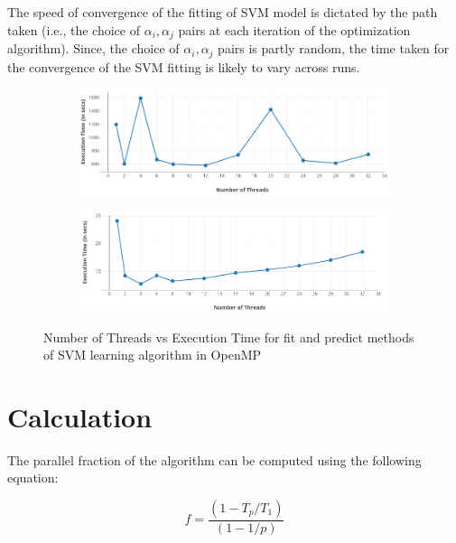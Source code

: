 \documentclass{article}
\begin{document}
	The speed of convergence of the fitting of SVM model is dictated by the path taken (i.e., the choice of $\alpha_i, \alpha_j$ pairs at each iteration of the optimization algorithm). Since, the choice of $\alpha_i, \alpha_j$ pairs is partly random, the time taken for the convergence of the SVM fitting is likely to vary across runs.
	
	\begin{figure}[!htbp]

		\centering
		\begin{subfigure}[!htbp]{\textwidth}
			\centering
			\includegraphics[scale=0.5]{fit_graph}
		\end{subfigure}
		
		\begin{subfigure}[!htbp]{\textwidth}
			\centering
			\includegraphics[scale=0.5]{predict_graph}
		\end{subfigure}
	
		\caption{Number of Threads vs Execution Time for fit and predict methods of SVM learning algorithm in OpenMP}
	\end{figure}
	
\section{Calculation}

	The parallel fraction of the algorithm can be computed using the following equation:

	\begin{equation}
		f = \frac{(1-T_p/T_1)}{(1-1/p)}
	\end{equation}
	
\end{document}
